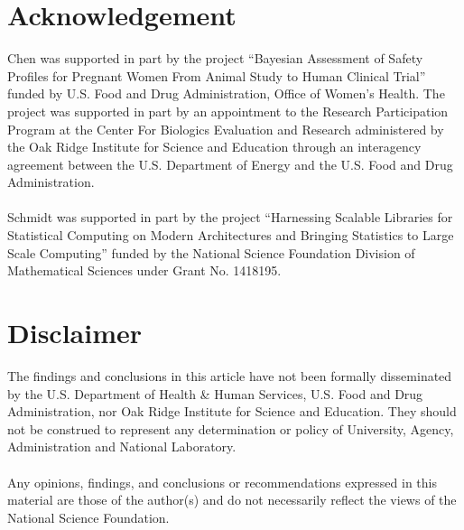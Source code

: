 
\section*{Acknowledgement}

Chen was supported in part by the project
``Bayesian Assessment of Safety Profiles for Pregnant Women From Animal
Study to Human Clinical Trial'' funded by U.S. Food and Drug Administration,
Office of Women's Health. The project was supported
in part by an appointment to the Research Participation Program at the
Center For Biologics Evaluation and Research administered by the Oak Ridge
Institute for Science and Education through an interagency agreement between
the U.S. Department of Energy and the U.S. Food and Drug Administration.
\\\\
Schmidt was supported in part by the project ``Harnessing Scalable Libraries 
for Statistical Computing on Modern Architectures and Bringing Statistics to 
Large Scale Computing'' funded by the National Science Foundation Division of 
Mathematical Sciences under Grant No. 1418195.

\section*{Disclaimer}

The findings and conclusions in this article have not been
formally disseminated by the U.S. Department of Health \& Human Services,
U.S. Food and Drug Administration, nor Oak Ridge Institute for Science and
Education. They should not be construed to represent any determination or
policy of University, Agency, Administration and National Laboratory.
\\\\
Any  opinions,  findings,  and  conclusions  or  recommendations
expressed  in  this  material  are those  of  the  author(s)  and  do  not
 necessarily  reflect  the  views  of  the  National  Science Foundation.
